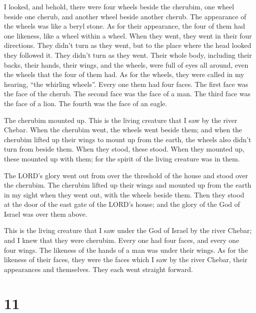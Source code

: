  I looked, and behold, there were four wheels beside the
cherubim, one wheel beside one cherub, and another wheel beside another
cherub. The appearance of the wheels was like a beryl stone.
 As for their appearance, the four of them had one
likeness, like a wheel within a wheel.  When they went,
they went in their four directions. They didn't turn as they went, but
to the place where the head looked they followed it. They didn't turn as
they went.  Their whole body, including their backs, their
hands, their wings, and the wheels, were full of eyes all around, even
the wheels that the four of them had.  As for the wheels,
they were called in my hearing, ``the whirling wheels''. 
Every one them had four faces. The first face was the face of the
cherub. The second face was the face of a man. The third face was the
face of a lion. The fourth was the face of an eagle.

 The cherubim mounted up. This is the living creature that
I saw by the river Chebar.  When the cherubim went, the
wheels went beside them; and when the cherubim lifted up their wings to
mount up from the earth, the wheels also didn't turn from beside them.
 When they stood, these stood. When they mounted up, these
mounted up with them; for the spirit of the living creature was in them.

 The LORD's glory went out from over the threshold of the
house and stood over the cherubim.  The cherubim lifted up
their wings and mounted up from the earth in my sight when they went
out, with the wheels beside them. Then they stood at the door of the
east gate of the LORD's house; and the glory of the God of Israel was
over them above.

 This is the living creature that I saw under the God of
Israel by the river Chebar; and I knew that they were cherubim.
 Every one had four faces, and every one four wings. The
likeness of the hands of a man was under their wings.  As
for the likeness of their faces, they were the faces which I saw by the
river Chebar, their appearances and themselves. They each went straight
forward.

\hypertarget{section-9}{%
\section{11}\label{section-9}}

